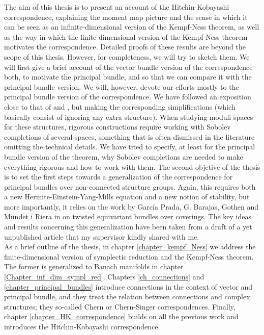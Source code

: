 The aim of this thesis is to present an account of the Hitchin-Kobayashi correspondence, explaining the moment map picture and the sense in which it can be seen as an infinite-dimensional version of the Kempf-Ness theorem, as well as the way in which the finite-dimensional version of the Kempf-Ness theorem motivates the correspondence. Detailed proofs of these results are beyond the scope of this thesis. However, for completeness, we will try to sketch them. We will first give a brief account of the vector bundle version of the correspondence both, to motivate the principal bundle, and so that we can compare it with the principal bundle version. We will, however, devote our efforts mostly to the principal bundle version of the correspondence. We have followed an exposition close to that of \parencite{i1999hitchin} and \parencite{garcia2009hitchin}, but making the corresponding simplifications (which basically consist of ignoring any extra structure). When studying moduli spaces for these structures, rigorous constructions require working with Sobolev completions of several spaces, something that is often dismissed in the literature omitting the technical details. We have tried to specify, at least for the principal bundle version of the theorem, why Sobolev completions are needed to make everything rigorous and how to work with them. The second objetive of the thesis is to set the first steps towards a generalization of the correspondence for principal bundles over non-connected structure groups. Again, this requires both a new Hermite-Einstein-Yang-Mills equation and a new notion of stability, but more importantly, it relies on the work by García Prada, G. Barajas, Gothen and Mundet i Riera in \parencite{barajas2023non} on twisted equivariant bundles over coverings. The key ideas and results concerning this generalization have been taken from a draft of a yet unpublished article that my supervisor kindly shared with me. \\

\thispagestyle{introduction}
As a brief outline of the thesis, in chapter \ref{chapter_kempf_Ness} we address the finite-dimensional version of symplectic reduction and the Kempf-Ness theorem. The former is generalized to Banach manifolds in chapter \ref{Chapter_inf_dim_sympl_red}. Chapters \ref{ch_connections} and \ref{chapter_principal_bundles} introduce connections in the context of vector and principal bundle, and they treat the relation between connections and complex structures; they so-called Chern or Chern-Singer correspondences. Finally, chapter \ref{chapter_HK_correspondence} builds on all the previous work and introduces the Hitchin-Kobayashi correspondence.\\

